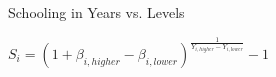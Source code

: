 \documentclass{beamer} %
\begin{document}



\begin{frame}{Schooling in Years vs. Levels}
    \begin{center}

        \begin{Large}
            $
                S_i = \left(1 + \beta_{i, higher} - \beta_{i, lower}\right)^{\frac{1}{Y_{i, higher} - Y_{i, lower}}} - 1
            $
        \end{Large}


    \end{center}
\end{frame}
\end{document}
